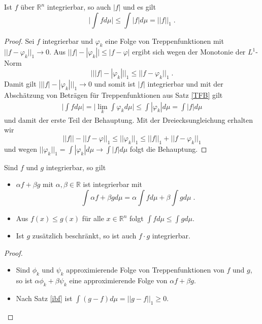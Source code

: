 \begin{Satz}
\label{ibf}
Ist $f$ über $\mathbb{R}^n$ integrierbar, so auch $|f|$ und es gilt
$$ \biggl | \int f d \mu \biggr | \leq \int  | f | d \mu = || f ||_1 \; .$$
\end{Satz}
\begin{proof}
Sei $f$ integrierbar und $\varphi_k$ eine Folge von Treppenfunktionen mit $|| f - \varphi_k ||_1 \to 0$. 
Aus $\bigl | | f | - | \varphi_k | \bigr | \leq | f -\varphi | $ ergibt sich wegen der Monotonie der $L^1$-Norm
$$\bigl |  \bigl |  | f | - | \varphi_k | \bigr | \bigr |_1 \leq \bigl |  \bigl |   f  -  \varphi_k  \bigr | \bigr |_1  \; .$$ 
Damit gilt $\bigl |  \bigl |  | f | - | \varphi_k | \bigr | \bigr |_1 \to 0$ und somit ist $|f|$ integrierbar und mit der Abschätzung von Beträgen für Treppenfunktionen aus Satz \ref{TFB} gilt 
\begin{align*}
\biggl | \int f d \mu \biggr | = \biggl | \lim_k \int \varphi_k d \mu \biggr | \leq  \int |\varphi_k| d \mu = \int |f| d\mu
\end{align*} 
und damit der erste Teil der Behauptung. 
Mit der Dreiecksungleichung erhalten wir
$$ || f || - ||  f - \varphi ||_1 \leq || \varphi_k ||_1  \leq || f ||_1 + || f - \varphi_k ||_1 $$
und wegen $|| \varphi_k ||_1 = \int | \varphi_k | d \mu \to \int | f | d \mu$ folgt die Behauptung.
\end{proof}


\begin{Bemerkung}[Rechenregeln]
Sind $f$ und $g$ integrierbar, so gilt
\begin{itemize}
\item $ \alpha f + \beta g$ mit $\alpha, \beta \in \mathbb{R}$ ist integrierbar mit 
$$\int \alpha f + \beta g d\mu = \alpha \int f d\mu + \beta \int g d \mu \; .$$ 
\item Aus $f(x) \leq g(x)$ für alle $x \in \mathbb{R}^n$ folgt $\int f d \mu \leq \int g d \mu$.
\item Ist $g$ zusätzlich beschränkt, so ist auch $f \cdot g$ integrierbar.
\end{itemize}
\end{Bemerkung}
\begin{proof}
\begin{itemize}
\item Sind $\phi_k$ und $\psi_k$ approximierende Folge von  Treppenfunktionen von $f$ und $g$, so ist $\alpha \phi_k + \beta \psi_k$ eine approximierende Folge von $\alpha f + \beta g$.
\item Nach Satz \ref{ibf} ist $\int (g-f) d \mu = || g - f ||_1 \geq 0$.
\end{itemize}
\end{proof}


